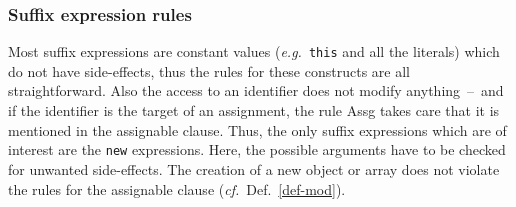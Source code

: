\documentclass[a4paper]{llncs}
\newcommand{\java}{\textsc{Java}}
\begin{document}
\subsubsection{Suffix expression rules}
Most suffix expressions are constant values (\emph{e.g.}~\texttt{this}
and all the literals) which do not have side-effects, thus the rules
for these constructs are all straightforward. Also the access to an
identifier does not modify anything~--~and if the identifier is the
target of an assignment, the rule \textsf{Assg} takes care that it is
mentioned in the assignable clause. Thus, the only suffix expressions
which are of interest are the \texttt{new} expressions. Here, the
possible arguments have to be checked for unwanted side-effects. The
creation of a new object or array does not violate the rules for the
assignable clause (\emph{cf.}~Def.~\ref{def-mod}).

\end{document}
